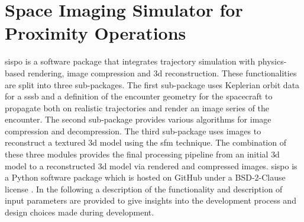 \section{Space Imaging Simulator for Proximity Operations} \label{sec:sispo}
\gls{sispo} is a software package that integrates trajectory simulation with physics-based rendering, image compression and \gls{3d} reconstruction. These functionalities are split into three sub-packages. The first sub-package uses Keplerian orbit data for a \gls{sssb} and a definition of the encounter geometry for the spacecraft to propagate both on realistic trajectories and render an image series of the encounter. The second sub-package provides various algorithms for image compression and decompression. The third sub-package uses images to reconstruct a textured \gls{3d} model using the \gls{sfm} technique. The combination of these three modules provides the final processing pipeline from an initial \gls{3d} model to a reconstructed \gls{3d} model via rendered and compressed images. \Gls{sispo} is a Python software package which is hosted on GitHub under a BSD-2-Clause license \cite{Schwarzkopf2020SpaceOperations}. In the following a description of the functionality and description of input parameters are provided to give insights into the development process and design choices made during development.




